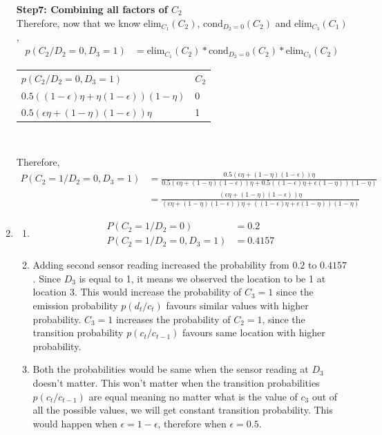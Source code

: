 \documentclass[12pt]{article}
\begin{document}
\begin{enumerate}[label=(\alph*)]
  \textbf{Step7: Combining all factors of $C_2$} \\
    Therefore, now that we know elim$_{C_1}(C_2)$, cond$_{D_2 = 0} (C_2)$ and elim$_{C_3}(C_1)$,
  \begin{align*}
  p(C_2/ D_2 = 0, D_3 = 1) &= \text{elim}_{C_1}(C_2) * \text{cond}_{D_2 = 0} (C_2) * \text{elim}_{C_3}(C_2)
  \end{align*}
  \begin{center}
  \begin{tabular}{ll}
  $p(C_2/ D_2 = 0, D_3 = 1)$ & $C_2$  \\
  $0.5((1 - \epsilon) \eta + \eta (1- \epsilon)) (1 - \eta)$            & 0       \\
  $0.5(\epsilon \eta + (1- \eta) (1 - \epsilon)) \eta$               & 1       \\
  \end{tabular} \newline \\
  \end{center}
  Therefore, 
  \begin{align*}
  P(C_2 = 1/D_2 = 0, D_3 = 1) &= \frac{0.5 (\epsilon \eta + (1- \eta) (1 - \epsilon)) \eta}{0.5(\epsilon \eta + (1- \eta) (1 - \epsilon)) \eta + 0.5 ((1 - \epsilon) \eta + \epsilon (1- \eta)) (1 - \eta)} \\
  &= \frac{(\epsilon \eta + (1- \eta) (1 - \epsilon)) \eta}{(\epsilon \eta + (1- \eta) (1 - \epsilon)) \eta + ((1 - \epsilon) \eta + \epsilon (1- \eta)) (1 - \eta)}
  \end{align*}
  \item
  \begin{enumerate}[label=\roman*.]
  \item
  \begin{align*}
  P(C_2 = 1/D_2 = 0) &= 0.2 \\
  P(C_2 = 1/D_2 = 0, D_3 = 1) &= 0.4157
  \end{align*}
  \item
  Adding second sensor reading increased the probability from $0.2$ to $0.4157$. Since $D_3$ is equal to 1, it means we observed the location to be 1 at location 3. This would increase the probability of $C_3 = 1$ since the emission probability $p(d_t/c_t)$ favours similar values with higher probability. $C_3 = 1$ increases the probability of $C_2 = 1$, since the transition probability $p(c_t/c_{t-1})$ favours same location with higher probability.
  \item Both the probabilities would be same when the sensor reading at $D_3$ doesn't matter. This won't matter when the transition probabilities $p(c_t/c_{t-1})$ are equal meaning no matter what is the value of $c_3$ out of all the possible values, we will get constant transition probability. This would happen when $\epsilon = 1 - \epsilon$, therefore when $\epsilon = 0.5$. 
  
  \end{enumerate}
\end{enumerate}
\end{document}
